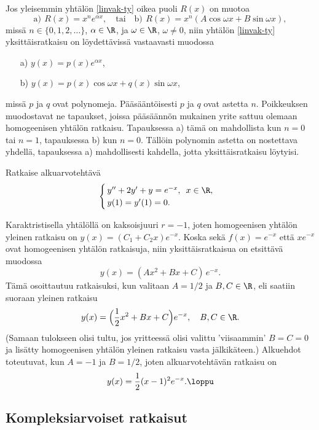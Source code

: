 Jos yleisemmin yhtälön \eqref{linvak-ty} oikea puoli $R(x)$ on muotoa
\[
\text{a)} \ \, R(x)=x^ne^{\alpha x}, \quad \text{tai} \quad 
\text{b)} \ \, R(x)=x^n(A\cos\omega x + B\sin\omega x),
\]
missä $n\in \{0,1,2,\ldots\}$, $\alpha\in\R$, ja $\omega\in\R$, $\omega\neq 0$, niin yhtälön
\eqref{linvak-ty} yksittäisratkaisu on löydettävissä vastaavasti muodossa
\begin{itemize}
\item[a)] $y(x)=p(x)e^{\alpha x}$,
\item[b)] $y(x)=p(x)\cos\omega x+q(x)\sin\omega x$,
\end{itemize}
missä $p$ ja $q$ ovat polynomeja. Pääsääntöisesti $p$ ja $q$ ovat astetta $n$. Poikkeuksen
muodostavat ne tapaukset, joissa pääsäännön mukainen yrite sattuu olemaan homogeenisen yhtälön
ratkaisu. Tapauksessa a) tämä on mahdollista kun $n=0$ tai $n=1$, tapauksessa b) kun $n=0$. 
Tällöin polynomin astetta on nostettava yhdellä, tapauksessa a) mahdollisesti kahdella, jotta
yksittäisratkaisu löytyisi.
\begin{Exa}
Ratkaise alkuarvotehtävä
\[
\begin{cases} \,y''+2y'+y=e^{-x},\,\ x\in\R, \\ \,y(1)=y'(1)=0. \end{cases}
\]
\end{Exa}
\ratk Karaktristisella yhtälöllä on kaksoisjuuri $r=-1$, joten homogeenisen yhtälön yleinen
ratkaisu on $y(x)=(C_1+C_2x)e^{-x}$. Koska sekä $f(x)=e^{-x}$ että $xe^{-x}$ ovat homogeenisen
yhtälön ratkaisuja, niin yksittäisratkaisua on etsittävä muodossa
\[
y(x)=(Ax^2+Bx+C)\,e^{-x}.
\]
Tämä osoittautuu ratkaisuksi, kun valitaan $A=1/2$ ja $B,C\in\R$, eli saatiin suoraan yleinen
ratkaisu
\[
y(x)=\Bigl(\frac{1}{2}x^2+Bx+C\Bigr)e^{-x}, \quad B,C\in\R.
\]
(Samaan tulokseen olisi tultu, jos yritteessä olisi valittu 'viisaammin' $B=C=0$ ja lisätty 
homogeenisen yhtälön yleinen ratkaisu vasta jälkikäteen.) Alkuehdot toteutuvat, kun
$A=-1$ ja $B=1/2$, joten alkuarvotehtävän ratkaisu on
\[
y(x) = \frac{1}{2}(x-1)^2e^{-x}.  \loppu
\]

\subsection*{Kompleksiarvoiset ratkaisut}

